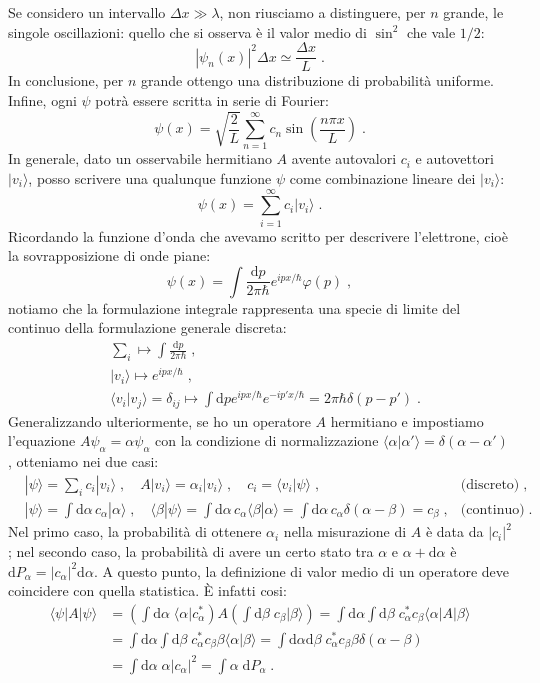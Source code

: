\documentclass[12pt,a4paper]{report}
\theoremstyle{definition}
\numberwithin{equation}{section}
\newcommand{\diff}[1][]{\mathrm{d}#1}
\newcommand{\bra}{\langle}
\newcommand{\ket}{\rangle}
\begin{document}
Se considero un intervallo $\Delta x \gg \lambda$, non riusciamo a distinguere, per $n$ grande, le singole oscillazioni: quello che si osserva è il valor medio di $\sin^2$ che vale $1/2$:
$$
|\psi_n(x)|^2\Delta x \simeq \frac{\Delta x}{L}\;.
$$
In conclusione, per $n$ grande ottengo una distribuzione di probabilità uniforme. Infine, ogni $\psi$ potrà essere scritta in serie di Fourier:
\begin{equation}
\psi(x)=\sqrt{\frac{2}{L}}\sum_{n=1}^{\infty} c_n\sin\left(\frac{n\pi x}{L}\right)\;.
\end{equation}
In generale, dato un osservabile hermitiano $A$ avente autovalori $c_i$ e autovettori $|v_i\ket$, posso scrivere una qualunque funzione $\psi$ come combinazione lineare dei $|v_i\ket$:
$$
\psi(x)=\sum_{i=1}^{\infty} c_i|v_i\ket\;.
$$
Ricordando la funzione d'onda che avevamo scritto per descrivere l'elettrone, cioè la sovrapposizione di onde piane:
$$
\psi(x)=\int \frac{\diff{p}}{2\pi\hbar}e^{ipx/\hbar}\varphi(p)\;,
$$
notiamo che la formulazione integrale rappresenta una specie di limite del continuo della formulazione generale discreta:
\begin{align*}
&\sum_i \longmapsto\int\frac{\diff{p}}{2\pi\hbar}\;, \\
&|v_i\ket\longmapsto e^{ipx/\hbar}\;, \\
&\bra v_i|v_j\ket=\delta_{ij}\longmapsto \int\diff{p}e^{ipx/\hbar}e^{-ip'x/\hbar}=2\pi\hbar\delta(p-p')\;.
\end{align*}
Generalizzando ulteriormente, se ho un operatore $A$ hermitiano e impostiamo l'equazione $A\psi_{\alpha}=\alpha\psi_{\alpha}$ con la condizione di normalizzazione $\bra\alpha|\alpha'\ket=\delta(\alpha-\alpha')$, otteniamo nei due casi:
\begin{align*}
&|\psi\ket =\sum_i c_i|v_i\ket\;,\quad A|v_i\ket=\alpha_i|v_i\ket\;,\quad c_i=\bra v_i|\psi\ket\;,&\mbox{(discreto)}\;, \\
&|\psi\ket=\int\diff{\alpha}\,c_{\alpha}|\alpha\ket\;,\quad \bra\beta|\psi\ket=\int\diff{\alpha}\,c_{\alpha}\bra\beta|\alpha\ket=\int\diff{\alpha}\,c_{\alpha}\delta(\alpha-\beta)=c_{\beta}\;, &\mbox{(continuo)}\;.
\end{align*}
Nel primo caso, la probabilità di ottenere $\alpha_i$ nella misurazione di $A$ è data da $|c_i|^2$; nel secondo caso, la probabilità di avere un certo stato tra $\alpha$ e $\alpha+\diff{\alpha}$ è $\diff{P_{\alpha}}=|c_{\alpha}|^2\diff{\alpha}$. A questo punto, la definizione di valor medio di un operatore deve coincidere con quella statistica. È infatti cosi:
\begin{align*}
\bra\psi|A|\psi\ket &= \left(\int\diff{\alpha}\; \bra\alpha|c_{\alpha}^*\right)A\left(\int\diff{\beta}\;c_{\beta}|\beta\ket\right)=
\int\diff{\alpha}\int\diff{\beta}\;c_{\alpha}^* c_{\beta} \bra\alpha|A|\beta\ket \\
&= \int\diff{\alpha}\int\diff{\beta}\; c_{\alpha}^*c_{\beta}\beta \bra\alpha|\beta\ket=\int\diff{\alpha}\diff{\beta}\; c_{\alpha}^*c_{\beta}\beta\delta(\alpha-\beta) \\
&= \int \diff{\alpha}\;\alpha|c_{\alpha}|^2=\int \alpha\;\diff{P_{\alpha}}\;.
\end{align*}
\end{document}
